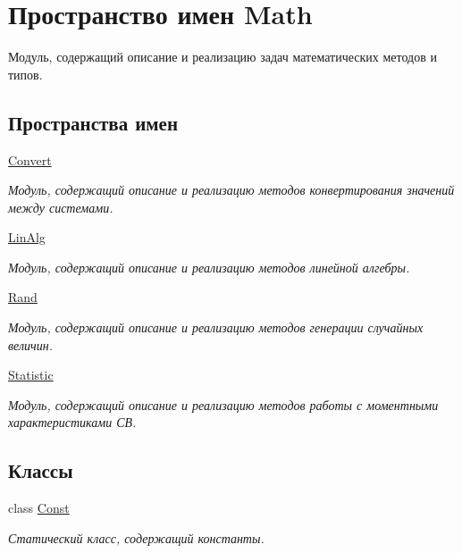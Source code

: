 \hypertarget{namespace_math}{}\section{Пространство имен Math}
\label{namespace_math}


Модуль, содержащий описание и реализацию задач математических методов и типов.  


\subsection*{Пространства имен}
\begin{DoxyCompactItemize}
\item 
 \hyperlink{namespace_math_1_1_convert}{Convert}
\begin{DoxyCompactList}\small\item\em Модуль, содержащий описание и реализацию методов конвертирования значений между системами. \end{DoxyCompactList}\item 
 \hyperlink{namespace_math_1_1_lin_alg}{Lin\+Alg}
\begin{DoxyCompactList}\small\item\em Модуль, содержащий описание и реализацию методов линейной алгебры. \end{DoxyCompactList}\item 
 \hyperlink{namespace_math_1_1_rand}{Rand}
\begin{DoxyCompactList}\small\item\em Модуль, содержащий описание и реализацию методов генерации случайных величин. \end{DoxyCompactList}\item 
 \hyperlink{namespace_math_1_1_statistic}{Statistic}
\begin{DoxyCompactList}\small\item\em Модуль, содержащий описание и реализацию методов работы с моментными характеристиками СВ. \end{DoxyCompactList}\end{DoxyCompactItemize}
\subsection*{Классы}
\begin{DoxyCompactItemize}
\item 
class \hyperlink{class_math_1_1_const}{Const}
\begin{DoxyCompactList}\small\item\em Статический класс, содержащий константы. \end{DoxyCompactList}\end{DoxyCompactItemize}
